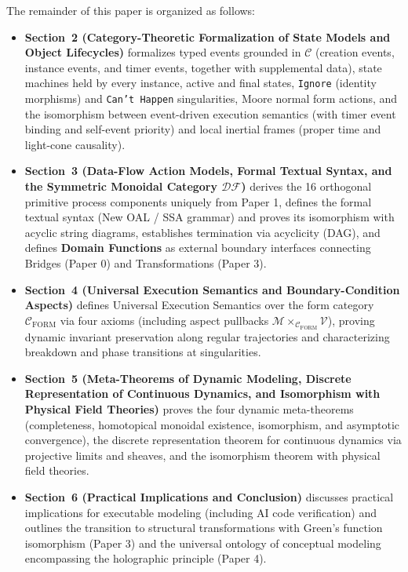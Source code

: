 \documentclass[11pt,a4paper]{article}
\theoremstyle{definition}
\theoremstyle{plain}
\theoremstyle{remark}
\newcommand{\DF}{\mathcal{DF}}
\newcommand{\Cform}{\mathcal{C}_{\mathrm{FORM}}}
\begin{document}
The remainder of this paper is organized as follows:
\begin{itemize}
    \item \textbf{Section~2 (Category-Theoretic Formalization of State Models and Object Lifecycles)} formalizes typed events grounded in $\mathcal{C}$ (creation events, instance events, and timer events, together with supplemental data), state machines held by every instance, active and final states, \texttt{Ignore} (identity morphisms) and \texttt{Can't Happen} singularities, Moore normal form actions, and the isomorphism between event-driven execution semantics (with timer event binding and self-event priority) and local inertial frames (proper time and light-cone causality).
    \item \textbf{Section~3 (Data-Flow Action Models, Formal Textual Syntax, and the Symmetric Monoidal Category $\DF$)} derives the 16 orthogonal primitive process components uniquely from Paper 1, defines the formal textual syntax (New OAL / SSA grammar) and proves its isomorphism with acyclic string diagrams, establishes termination via acyclicity (DAG), and defines \textbf{Domain Functions} as external boundary interfaces connecting Bridges (Paper 0) and Transformations (Paper 3).
    \item \textbf{Section~4 (Universal Execution Semantics and Boundary-Condition Aspects)} defines Universal Execution Semantics over the form category $\Cform$ via four axioms (including aspect pullbacks $\mathcal{M} \times_{\Cform} \mathcal{V}$), proving dynamic invariant preservation along regular trajectories and characterizing breakdown and phase transitions at singularities.
    \item \textbf{Section~5 (Meta-Theorems of Dynamic Modeling, Discrete Representation of Continuous Dynamics, and Isomorphism with Physical Field Theories)} proves the four dynamic meta-theorems (completeness, homotopical monoidal existence, isomorphism, and asymptotic convergence), the discrete representation theorem for continuous dynamics via projective limits and sheaves, and the isomorphism theorem with physical field theories.
    \item \textbf{Section~6 (Practical Implications and Conclusion)} discusses practical implications for executable modeling (including AI code verification) and outlines the transition to structural transformations with Green's function isomorphism (Paper 3) and the universal ontology of conceptual modeling encompassing the holographic principle (Paper 4).
\end{itemize}
\end{document}
